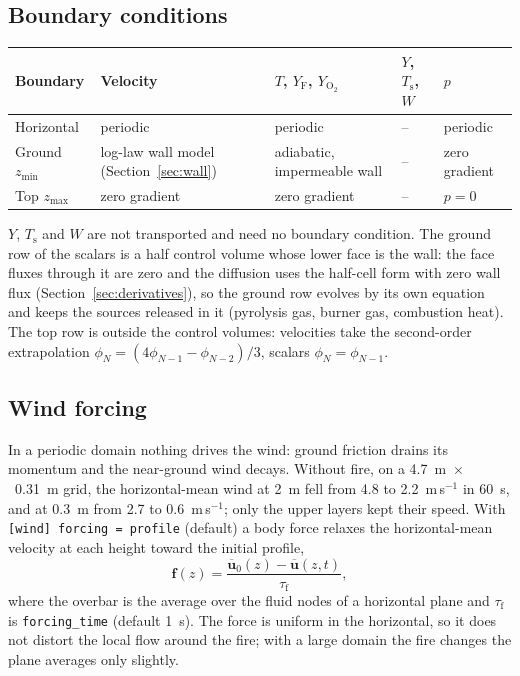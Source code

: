 \documentclass[11pt,a4paper]{article}
\newcommand{\vu}{\mathbf{u}}
\newcommand{\code}[1]{\texttt{#1}}
\newcommand{\Yf}{Y_\text{F}}
\newcommand{\YO}{Y_{\mathrm{O_2}}}
\begin{document}
\subsection{Boundary conditions}
\begin{center}
\begin{tabular}{>{\raggedright\arraybackslash}p{2.3cm}>{\raggedright\arraybackslash}p{4.2cm}>{\raggedright\arraybackslash}p{3.3cm}>{\raggedright\arraybackslash}p{1.6cm}>{\raggedright\arraybackslash}p{2.0cm}}
\toprule
Boundary & Velocity & $T$, $\Yf$, $\YO$ & $Y$, $T_\text{s}$, $W$ & $p$ \\
\midrule
Horizontal & periodic & periodic & -- & periodic \\
Ground $z_\text{min}$ & log-law wall model (Section~\ref{sec:wall}) & adiabatic, impermeable wall & -- & zero gradient \\
Top $z_\text{max}$ & zero gradient & zero gradient & -- & $p=0$ \\
\bottomrule
\end{tabular}
\end{center}
$Y$, $T_\text{s}$ and $W$ are not transported and need no boundary condition. The ground row of the scalars
is a half control volume whose lower face is the wall: the face fluxes through it are zero and the
diffusion uses the half-cell form with zero wall flux (Section~\ref{sec:derivatives}), so the ground
row evolves by its own equation and keeps the sources released in it (pyrolysis gas, burner gas,
combustion heat). The top row is outside the control volumes: velocities take the second-order
extrapolation $\phi_N=(4\phi_{N-1}-\phi_{N-2})/3$, scalars $\phi_N=\phi_{N-1}$.

\subsection{Wind forcing}\label{sec:forcing}
In a periodic domain nothing drives the wind: ground friction drains its momentum and the
near-ground wind decays. Without fire, on a 4.7~m~$\times$~0.31~m grid, the horizontal-mean wind at
2~m fell from 4.8 to 2.2~m\,s$^{-1}$ in 60~s, and at 0.3~m from 2.7 to 0.6~m\,s$^{-1}$; only the upper
layers kept their speed. With \code{[wind] forcing = profile} (default) a body force relaxes the
horizontal-mean velocity at each height toward the initial profile,
\begin{equation}
  \mathbf{f}(z) = \frac{\overline{\vu}_0(z) - \overline{\vu}(z,t)}{\tau_\text{f}},
\end{equation}
where the overbar is the average over the fluid nodes of a horizontal plane and $\tau_\text{f}$ is
\code{forcing\_time} (default 1~s). The force is uniform in the horizontal, so it does not distort
the local flow around the fire; with a large domain the fire changes the plane averages only
slightly.
\end{document}
